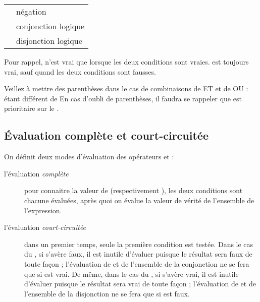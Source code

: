 			\begin{center}
			\tablehead{}
			\begin{supertabular}{m{1cm}|m{12cm}}
			\raggedleft  {} & négation\\
			\raggedleft  {} & conjonction logique\\
			\raggedleft  {} & disjonction logique\\
			\end{supertabular}
			\end{center}
	
			Pour rappel,  n’est vrai que lorsque
			les deux conditions sont vraies.  est
			toujours vrai, sauf quand les deux conditions sont fausses.
	
			Veillez à mettre des parenthèses dans le cas de combinaisons de ET et de
			OU :  étant différent de
			 En cas
			d'oubli de parenthèses, il faudra se rappeler que
			 est prioritaire sur le .
	
		\subsection{Évaluation complète et court-circuitée}
	
			On définit deux modes d’évaluation des opérateurs 
			et  :
	
			\begin{description}
			\item[l’évaluation \textit{complète}]
				pour connaitre la valeur de
				 (respectivement
				), les deux conditions sont chacune
				évaluées, après quoi on évalue la valeur de vérité de l’ensemble de
				l'expression.
			\item[l’évaluation \textit{court-circuitée}]
				dans un premier temps, seule la
				première condition est testée. Dans le cas du ,
				si  s’avère faux, il est inutile d’évaluer
				 puisque le résultat sera faux de toute façon
				; l’évaluation de  et de l’ensemble de la
				conjonction ne se fera que si  est vrai. De
				même, dans le cas du , si
				 s’avère vrai, il est inutile d’évaluer
				 puisque le résultat sera vrai de toute façon
				; l’évaluation de  et de l’ensemble de la
				disjonction ne se fera que si  est faux.
			\end{description}
	
